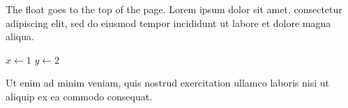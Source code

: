 \documentclass{article}
\begin{document}
The float goes to the top of the page. Lorem ipsum dolor sit amet,
consectetur adipiscing elit, sed do eiusmod tempor incididunt ut labore et
dolore magna aliqua.

\begin{algorithm}[t]
\caption{At the top}
\begin{algorithmic}[1]
\State $x \gets 1$
\State $y \gets 2$
\end{algorithmic}
\end{algorithm}

Ut enim ad minim veniam, quis nostrud exercitation ullamco laboris nisi ut
aliquip ex ea commodo consequat.
\end{document}
